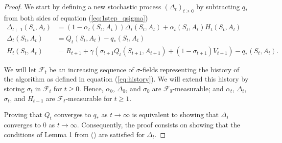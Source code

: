 \begin{proof}
We start by defining a new stochastic process $(\Delta_t)_{t\geq0}$ by subtracting $q_*$ from both sides of equation (\ref{eq:1step_qsigma})
%
\begin{align}
\label{eq:delta_update}
\Delta_{t+1} (S_t, A_t) &= (1 - \alpha_t(S_t, A_t)) \Delta_t (S_t, A_t) 
	+ \alpha_t (S_t, A_t) H_t (S_t, A_t)
  	\\
\Delta_t (S_t, A_t) &= Q_t (S_t, A_t) - q_* (S_t, A_t) 
	\nonumber \\
H_t(S_t, A_t) &=  R_{t+1} + \gamma (\sigma_{t+1} Q_t (S_{t+1}, A_{t+1})  
	+ (1-\sigma_{t+1})  V_{t+1}) - q_* (S_t, A_t). \nonumber
\end{align}

We will let $\mathcal{F}_t$ be an increasing sequence of $\sigma$-fields representing the history of the algorithm as defined in equation (\ref{eq:history}).
We will extend this history by storing $\sigma_t$ in $\mathcal{F}_t$ for $t \geq 0$. 
Hence, $\alpha_0$, $\Delta_0$, and $\sigma_0$ are $\mathcal{F}_0$-measurable; and $\alpha_t$, $\Delta_t$, $\sigma_t$, and $H_{t-1}$ are $\mathcal{F}_t$-measurable for $t \geq 1$.

Proving that $Q_t$ converges to $q_*$ as $t \rightarrow \infty$  is equivalent to showing that $\Delta_t$ converges to $0$ as $t \rightarrow \infty$. 
Consequently, the proof consists on showing that the conditions of Lemma 1 from \citeauthor{Singh2000} (\citeyear{Singh2000}) are satisfied for $\Delta_t$. 


\end{proof}
